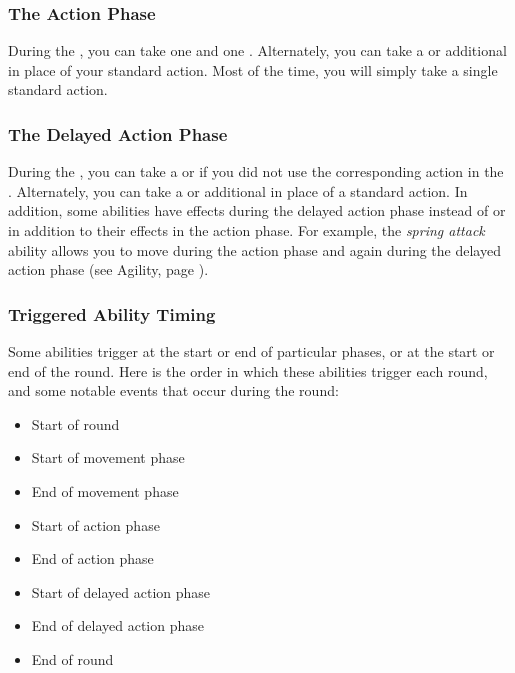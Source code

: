         \subsubsection{The Action Phase}\label{The Action Phase}
            During the , you can take one  and one .
            Alternately, you can take a  or additional  in place of your standard action.
            Most of the time, you will simply take a single standard action.

        \subsubsection{The Delayed Action Phase}\label{The Delayed Action Phase}
            During the , you can take a  or  if you did not use the corresponding action in the .
            Alternately, you can take a  or additional  in place of a standard action.
            In addition, some abilities have effects during the delayed action phase instead of or in addition to their effects in the action phase.
            For example, the \textit{spring attack} ability allows you to move during the action phase and again during the delayed action phase (see Agility, page ).

        \subsubsection{Triggered Ability Timing}\label{Triggered Ability Timing}
            Some abilities trigger at the start or end of particular phases, or at the start or end of the round.
            Here is the order in which these abilities trigger each round, and some notable events that occur during the round:
            \begin{itemize}
                \item Start of round
                \item Start of movement phase
                \item End of movement phase
                \item Start of action phase
                \item End of action phase
                \item Start of delayed action phase
                \item End of delayed action phase
                \item End of round
            \end{itemize}


